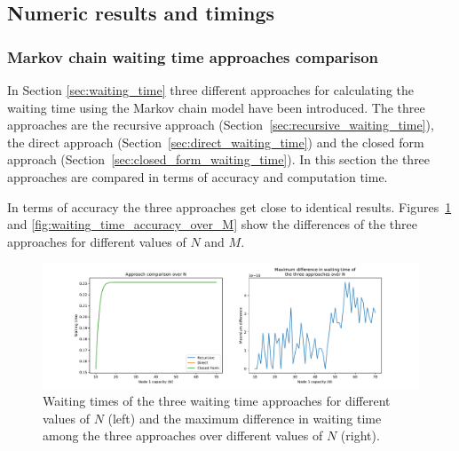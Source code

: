 \subsection{Numeric results and timings}\label{sec:truncation_effect}


\subsubsection{Markov chain waiting time approaches comparison}
\label{sec:waiting_time_approach_comparison}

In Section \ref{sec:waiting_time} three different approaches for calculating
the waiting time using the Markov chain model have been introduced.
The three approaches are the recursive approach
(Section~\ref{sec:recursive_waiting_time}), the direct approach
(Section~\ref{sec:direct_waiting_time}) and the closed form
approach (Section~\ref{sec:closed_form_waiting_time}).
In this section the three approaches are compared in terms of accuracy and
computation time.

In terms of accuracy the three approaches get close to identical results.
Figures~\ref{fig:waiting_time_accuracy_over_N} and
\ref{fig:waiting_time_accuracy_over_M} show the differences of the three
approaches for different values of \(N\) and \(M\).


\begin{figure}[H]
    \includegraphics[width=\textwidth]{chapters/03_queueing_model/img/numeric_results_and_timings/waiting_time_formulas_comparison/waiting_time_over_N.pdf}
    \caption{
        Waiting times of the three waiting time approaches for different
        values of \(N\) (left) and the maximum difference in waiting time among
        the three approaches over different values of \(N\) (right).
    }
    \label{fig:waiting_time_accuracy_over_N}
\end{figure}
    
